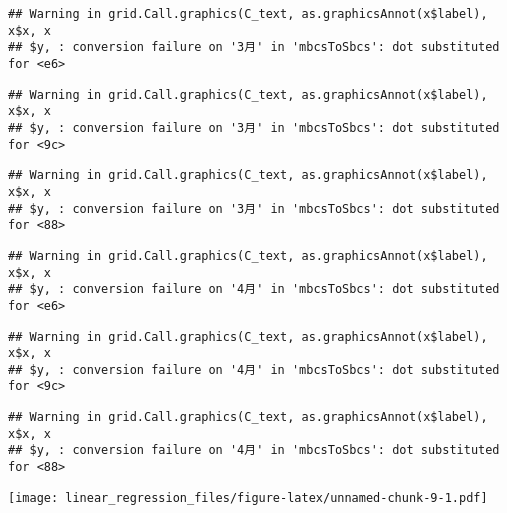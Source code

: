 \documentclass[]{ctexart}
\newenvironment{Shaded}{\begin{snugshade}}{\end{snugshade}}
\newcommand{\KeywordTok}[1]{\textcolor[rgb]{0.13,0.29,0.53}{\textbf{{#1}}}}
\newcommand{\DataTypeTok}[1]{\textcolor[rgb]{0.13,0.29,0.53}{{#1}}}
\newcommand{\DecValTok}[1]{\textcolor[rgb]{0.00,0.00,0.81}{{#1}}}
\newcommand{\StringTok}[1]{\textcolor[rgb]{0.31,0.60,0.02}{{#1}}}
\newcommand{\NormalTok}[1]{{#1}}
\begin{document}
\begin{verbatim}
## Warning in grid.Call.graphics(C_text, as.graphicsAnnot(x$label), x$x, x
## $y, : conversion failure on '3月' in 'mbcsToSbcs': dot substituted for <e6>
\end{verbatim}

\begin{verbatim}
## Warning in grid.Call.graphics(C_text, as.graphicsAnnot(x$label), x$x, x
## $y, : conversion failure on '3月' in 'mbcsToSbcs': dot substituted for <9c>
\end{verbatim}

\begin{verbatim}
## Warning in grid.Call.graphics(C_text, as.graphicsAnnot(x$label), x$x, x
## $y, : conversion failure on '3月' in 'mbcsToSbcs': dot substituted for <88>
\end{verbatim}

\begin{verbatim}
## Warning in grid.Call.graphics(C_text, as.graphicsAnnot(x$label), x$x, x
## $y, : conversion failure on '4月' in 'mbcsToSbcs': dot substituted for <e6>
\end{verbatim}

\begin{verbatim}
## Warning in grid.Call.graphics(C_text, as.graphicsAnnot(x$label), x$x, x
## $y, : conversion failure on '4月' in 'mbcsToSbcs': dot substituted for <9c>
\end{verbatim}

\begin{verbatim}
## Warning in grid.Call.graphics(C_text, as.graphicsAnnot(x$label), x$x, x
## $y, : conversion failure on '4月' in 'mbcsToSbcs': dot substituted for <88>
\end{verbatim}

\texttt{[image: linear\_regression\_files/figure-latex/unnamed-chunk-9-1.pdf]}

\begin{Shaded}
\end{Shaded}
\end{document}
